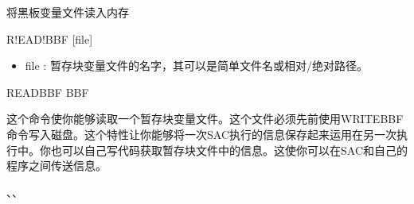 \label{cmd:readbbf}

将黑板变量文件读入内存

\begin{SACSTX}
R!EAD!BBF [file]
\end{SACSTX}

\begin{itemize}
\item file : 暂存块变量文件的名字，其可以是简单文件名或相对/绝对路径。
\end{itemize}

\begin{SACDFT}
READBBF BBF
\end{SACDFT}

这个命令使你能够读取一个暂存块变量文件。这个文件必须先前使用WRITEBBF命令写入磁盘。这个特性让你能够将一次SAC执行的信息保存起来运用在另一次执行中。你也可以自己写代码获取暂存块文件中的信息。这使你可以在SAC和自己的程序之间传送信息。

、、
